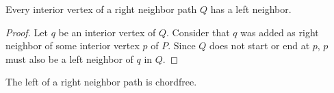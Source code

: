     \begin{lemma}
      \label{lm:right:leftNeighborsOfTheRightNeighborPath}
      Every interior vertex of a right neighbor path $Q$ has a left neighbor.
    \end{lemma}
    \begin{proof}
      Let $q$ be an interior vertex of $Q$. Consider that $q$ was added as right neighbor of some interior vertex $p$ of $P$. Since $Q$ does not start or end at $p$, $p$ must also be a left neighbor of $q$ in $Q$.
    \end{proof}

    \begin{lemma}
      \label{lm:right:neighbourwalkChordFree}
      The left of a right neighbor path is chordfree.
    \end{lemma}
